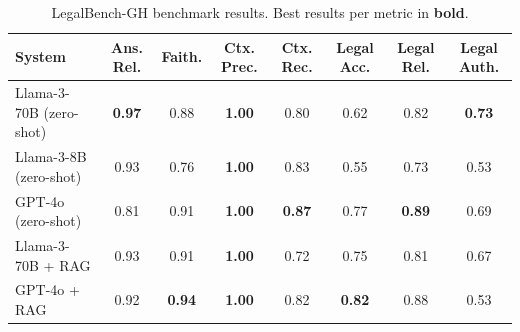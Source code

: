\begin{table}[t]
\centering
\small
\begin{tabular}{lccccccc}
\toprule
\textbf{System} & \textbf{Ans. Rel.} & \textbf{Faith.} & \textbf{Ctx. Prec.} & \textbf{Ctx. Rec.} & \textbf{Legal Acc.} & \textbf{Legal Rel.} & \textbf{Legal Auth.} \\
\midrule
Llama-3-70B (zero-shot) & \textbf{0.97} & 0.88 & \textbf{1.00} & 0.80 & 0.62 & 0.82 & \textbf{0.73} \\
Llama-3-8B (zero-shot) & 0.93 & 0.76 & \textbf{1.00} & 0.83 & 0.55 & 0.73 & 0.53 \\
GPT-4o (zero-shot) & 0.81 & 0.91 & \textbf{1.00} & \textbf{0.87} & 0.77 & \textbf{0.89} & 0.69 \\
Llama-3-70B + RAG & 0.93 & 0.91 & \textbf{1.00} & 0.72 & 0.75 & 0.81 & 0.67 \\
GPT-4o + RAG & 0.92 & \textbf{0.94} & \textbf{1.00} & 0.82 & \textbf{0.82} & 0.88 & 0.53 \\
\bottomrule
\end{tabular}
\caption{LegalBench-GH benchmark results. Best results per metric in \textbf{bold}.}
\label{tab:benchmark-results}
\end{table}